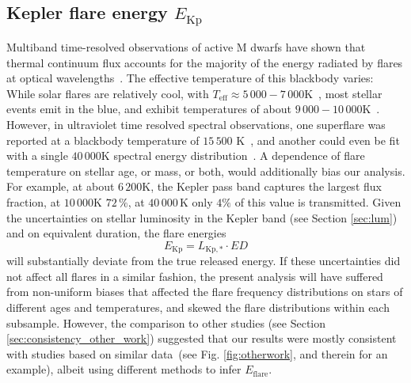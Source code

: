 \documentclass{aa}
\begin{document}
\subsection{Kepler flare energy $E_\mathrm{Kp}$}
\label{sec:en}
Multiband time-resolved observations of active M dwarfs have shown that thermal continuum flux accounts for the majority  of the energy radiated by flares at optical wavelengths~\citep{kowalski2013}. %
The effective temperature of this blackbody varies:
While solar flares are relatively cool, with \mbox{$T_\mathrm{eff}\approx5\,000-7\,000 $\;K}~\citep{kleint_solarstellarwlf_2016, kerr_solarstellarwlf_2014, watanabe_solarstellarwlf_2013, namekata_solarstellarwlf_2017}, most stellar events emit in the blue, and exhibit temperatures of about $9\,000-10\,000$\;K~\citep{1992ApJS...78..565H, kretzschmar_sun_2011, davenport_multi-wavelength_2012, shibayama2013}. However, in ultraviolet time resolved spectral observations, one superflare was reported at a blackbody temperature of $15\,500$ K~\citep{loyd2018}, and another could even be fit with a single $40\,000$\;K spectral energy distribution~\citep{froning_40000_2019}.
A dependence of flare temperature on stellar age, or mass, or both, would additionally bias our analysis. For example, at about $6\,200$\;K, the Kepler pass band captures the largest flux fraction, at $10\,000$\;K $72\,\%$, at $40\,000$\,K only $4\%$ of this value is transmitted. 
Given the uncertainties on stellar luminosity in the Kepler band (see Section \ref{sec:lum}) and on equivalent duration, the flare energies
\begin{equation}
E_\mathrm{Kp} = L_\mathrm{Kp,*} \cdot ED
\end{equation}  
will substantially deviate from the true released energy. If these uncertainties did not affect all flares in a similar fashion, the present analysis will have suffered from non-uniform biases that affected the flare frequency distributions on stars of different ages and temperatures, and skewed the flare distributions within each subsample. However, the comparison to other studies (see Section \ref{sec:consistency_other_work}) suggested that our results were mostly consistent with studies based on similar data~(see Fig. \ref{fig:otherwork}, and \citealt{lin2019} therein for an example), albeit using different methods to infer $E_\mathrm{flare}$.  
\end{document}
